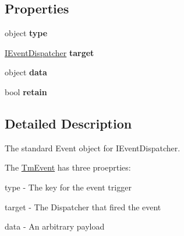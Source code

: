\subsection*{Properties}
\begin{DoxyCompactItemize}
\item 
\hypertarget{classstrange_1_1extensions_1_1dispatcher_1_1eventdispatcher_1_1impl_1_1_tm_event_a76779732b987bf2d611735a6e6c328f6}{object {\bfseries type}}\label{classstrange_1_1extensions_1_1dispatcher_1_1eventdispatcher_1_1impl_1_1_tm_event_a76779732b987bf2d611735a6e6c328f6}

\item 
\hypertarget{classstrange_1_1extensions_1_1dispatcher_1_1eventdispatcher_1_1impl_1_1_tm_event_a4fad0978eb6dd43804c35390f96c23a6}{\hyperlink{interfacestrange_1_1extensions_1_1dispatcher_1_1eventdispatcher_1_1api_1_1_i_event_dispatcher}{I\-Event\-Dispatcher} {\bfseries target}}\label{classstrange_1_1extensions_1_1dispatcher_1_1eventdispatcher_1_1impl_1_1_tm_event_a4fad0978eb6dd43804c35390f96c23a6}

\item 
\hypertarget{classstrange_1_1extensions_1_1dispatcher_1_1eventdispatcher_1_1impl_1_1_tm_event_a2a7919deb2f3212dd0bcbf2ce86624fb}{object {\bfseries data}}\label{classstrange_1_1extensions_1_1dispatcher_1_1eventdispatcher_1_1impl_1_1_tm_event_a2a7919deb2f3212dd0bcbf2ce86624fb}

\item 
\hypertarget{classstrange_1_1extensions_1_1dispatcher_1_1eventdispatcher_1_1impl_1_1_tm_event_a045d66330311bed8fd8a256479cab8f9}{bool {\bfseries retain}}\label{classstrange_1_1extensions_1_1dispatcher_1_1eventdispatcher_1_1impl_1_1_tm_event_a045d66330311bed8fd8a256479cab8f9}

\end{DoxyCompactItemize}


\subsection{Detailed Description}
The standard Event object for I\-Event\-Dispatcher. 

The \hyperlink{classstrange_1_1extensions_1_1dispatcher_1_1eventdispatcher_1_1impl_1_1_tm_event}{Tm\-Event} has three proeprties\-: 
\begin{DoxyItemize}
\item type -\/ The key for the event trigger 
\item target -\/ The Dispatcher that fired the event 
\item data -\/ An arbitrary payload 
\end{DoxyItemize}

